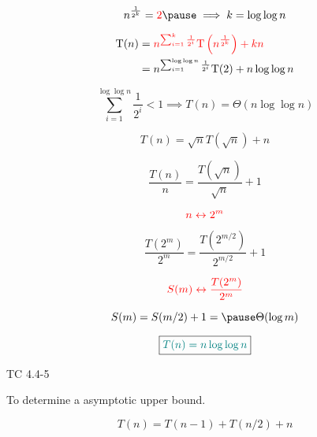 \begin{frame}{}
  \[
    n^{\frac{1}{2^k}} = \red{2} \pause \implies k = \log\log n
  \]

  \pause
  \vspace{-0.30cm}
  \begin{align*} 
    \text{T}(n) &= \textcolor{red}{n^{\sum_{i=1}^{k}\frac{1}{2^i}} \text{T}\left(n^{\frac{1}{2^k}}\right) + kn}\\ 
	    &=n^{\sum_{i=1}^{\log\log n}\frac{1}{2^i}} \text{T}(2) + n \log\log n\\ 
  \end{align*}

  \pause
  \vspace{-0.30cm}
  \[
    \sum_{i=1}^{\log \log n}\frac{1}{2^i} < 1 \implies T(n) = \Theta(n \log \log n)
  \]

  \pause
  \vspace{0.40cm}
  \begin{center}
    {}
  \end{center}
\end{frame}

\begin{frame}{}
  \[
    \boxed{T(n) = \sqrt{n} T(\sqrt{n}) + n}
  \]

  \pause
  \[
    \frac{T(n)}{n} = \frac{T(\sqrt{n})}{\sqrt{n}} + 1
  \]

  \pause
  \[
    \textcolor{red}{n \leftrightarrow 2^m}
  \]

  \pause
  \[
    \frac{T(2^m)}{2^m} = \frac{T(2^{m/2})}{2^{m/2}} + 1
  \]

  \pause
  \[
    \textcolor{red}{S(m) \leftrightarrow \frac{T(2^m)}{2^m}}
  \]

  \pause
  \[
    S(m) = S(m/2) + 1 = \pause \Theta(\log m)
  \]

  \pause
  \vspace{-0.60cm}
  \[
    \boxed{\textcolor{teal}{T(n) = n \log \log n}}
  \]
\end{frame}

\begin{frame}{}
  \begin{exampleblock}{TC 4.4-5}
    \begin{center}
      To determine a  asymptotic upper bound.
    \end{center}

    \[
      T(n) = T(n-1) + T(n/2) + n
    \]
  \end{exampleblock}

  \pause
\end{frame}

